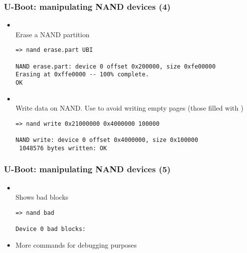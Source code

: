 \begin{frame}[fragile]
  \frametitle{U-Boot: manipulating NAND devices (4)}
  \begin{itemize}
  \item {}\\
    Erase a NAND partition
    \begin{block}{}
    \footnotesize
    \begin{verbatim}
=> nand erase.part UBI

NAND erase.part: device 0 offset 0x200000, size 0xfe00000
Erasing at 0xffe0000 -- 100% complete.
OK
    \end{verbatim}
    \end{block}
  \item {}\\
    Write data on NAND. Use  to avoid writing empty pages
    (those filled with )
    \begin{block}{}
    \footnotesize
    \begin{verbatim}
=> nand write 0x21000000 0x4000000 100000

NAND write: device 0 offset 0x4000000, size 0x100000
 1048576 bytes written: OK
    \end{verbatim}
    \end{block}
  \end{itemize}
\end{frame}

\begin{frame}[fragile]
  \frametitle{U-Boot: manipulating NAND devices (5)}
  \begin{itemize}
  \item {}\\
    Shows bad blocks
    \begin{block}{}
    \footnotesize
    \begin{verbatim}
=> nand bad

Device 0 bad blocks:
    \end{verbatim}
    \end{block}
  \item More commands for debugging purposes
  \end{itemize}
\end{frame}


